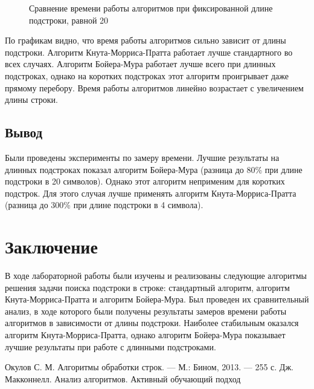 \documentclass[a4paper,12pt]{report}
\begin{document}
		\begin{figure}[h!]
			\caption{Сравнение времени работы алгоритмов при фиксированной длине подстроки, равной 20}
			\label{graph:len20}
		\end{figure} 
	
	\newpage
        
        По графикам видно, что время работы алгоритмов сильно зависит от длины подстроки. 
        Алгоритм Кнута-Морриса-Пратта работает лучше стандартного во всех случаях. 
        Алгоритм Бойера-Мура работает лучше всего при длинных подстроках, однако на коротких подстроках этот алгоритм проигрывает даже прямому перебору. 
        Время работы алгоритмов линейно возрастает с увеличением длины строки.
        
    \section{Вывод}

        Были проведены эксперименты по замеру времени. 
        Лучшие результаты на длинных подстроках показал алгоритм Бойера-Мура (разница до 80\% при длине подстроки в 20 символов). 
        Однако этот алгоритм неприменим для коротких подстрок. Для этого случая лучше применять алгоритм Кнута-Морриса-Пратта (разница до 300\% при длине подстроки в 4 символа).

    \newpage

    \chapter*{Заключение}
        \label{sec:conclusion_part}
        
        В ходе лабораторной работы были изучены и реализованы следующие алгоритмы решения задачи поиска подстроки в строке: стандартный алгоритм, алгоритм Кнута-Морриса-Пратта и алгоритм Бойера-Мура. 
        Был проведен их сравнительный анализ, в ходе которого были получены результаты замеров времени работы алгоритмов в зависимости от длины подстроки. 
        Наиболее стабильным оказался алгоритм Кнута-Морриса-Пратта, однако алгоритм Бойера-Мура показывает лучшие результаты при работе с длинными подстроками.
        
    \begin{thebibliography}{3}
    	 Окулов С. М. Алгоритмы обработки строк. — М.: Бином, 2013. — 255 с.
    	 Дж. Макконнелл. Анализ алгоритмов. Активный обучающий подход
    \end{thebibliography}
        
\end{document}

